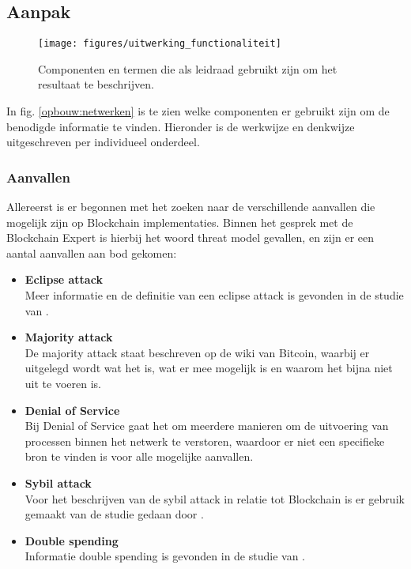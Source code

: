 \newpage
\subsection{Aanpak}

\begin{wrapfigure}[14]{r}{0.6\textwidth}
  \texttt{[image: figures/uitwerking\_functionaliteit]}
  \caption[Opbouw beantwoording ``Functionaliteit en gevaren'']{Componenten en termen die als leidraad gebruikt zijn om het resultaat te beschrijven.}
  \label{opbouw:functionaliteit}
\end{wrapfigure}

In fig. \ref{opbouw:netwerken} is te zien welke componenten er gebruikt zijn om de benodigde informatie te vinden. Hieronder is de werkwijze en denkwijze uitgeschreven per individueel onderdeel.

\subsubsection{Aanvallen}

Allereerst is er begonnen met het zoeken naar de verschillende aanvallen die mogelijk zijn op Blockchain implementaties. Binnen het gesprek met de Blockchain Expert is hierbij het woord threat model gevallen, en zijn er een aantal aanvallen aan bod gekomen:

\begin{itemize}
  \item \textbf{Eclipse attack}
  \\ Meer informatie en de definitie van een eclipse attack is gevonden in de studie van \cite{heilman2015eclipse}.

  \item \textbf{Majority attack}
  \\ De majority attack staat beschreven op de wiki van Bitcoin, waarbij er uitgelegd wordt wat het is, wat er mee mogelijk is en waarom het bijna niet uit te voeren is.

  \item \textbf{Denial of Service}
  \\ Bij Denial of Service gaat het om meerdere manieren om de uitvoering van processen binnen het netwerk te verstoren, waardoor er niet een specifieke bron te vinden is voor alle mogelijke aanvallen.

  \item \textbf{Sybil attack}
  \\ Voor het beschrijven van de sybil attack in relatie tot Blockchain is er gebruik gemaakt van de studie gedaan door \cite{conti2017survey}.

  \item \textbf{Double spending}
  \\ Informatie double spending is gevonden in de studie van \cite{karame2012double}.
\end{itemize}

